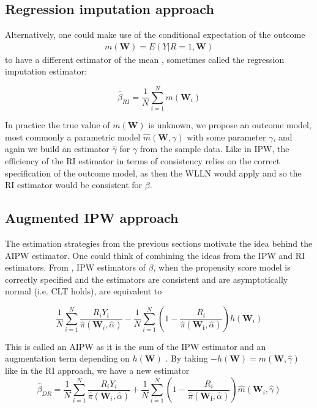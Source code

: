\documentclass[12pt,twoside]{article}
\begin{document}
\subsection{Regression imputation approach} 

Alternatively, one could make use of the conditional expectation of the outcome 
\begin{align*}
    m(\mathbf{W}) = E(Y|R= 1,\mathbf{W})
\end{align*}
to have a different estimator of the mean \citep{davidian,vansteelandt}, sometimes called the regression imputation estimator: 

\begin{equation}
    \hat{\beta}_ {RI} = \frac{1}{N}\sum_{i=1}^N m(\mathbf{W}_i)
\end{equation}

In practice the true value of $m(\mathbf{W})$ is unknown, we propose an outcome model, most commonly a parametric model $\hat m(\mathbf{W}, \gamma)$ with some parameter $\gamma$, and again we build an estimator $\hat{\gamma}$ for $\gamma$ from the sample data. Like in IPW, the efficiency of the RI estimator in terms of consistency relies on the correct specification of the outcome model, as then the WLLN would apply and so the RI estimator would be consistent for $\beta$. \\

\subsection{Augmented IPW approach} 

The estimation strategies from the previous sections motivate the idea behind the AIPW estimator. One could think of combining the ideas from the IPW and RI estimators. From \citet{davidian}, IPW estimators of $\beta$, when the propensity score model is correctly specified and the estimators are consistent and are asymptotically normal (i.e. CLT holds), are equivalent to 

\begin{equation}
    \frac{1}{N}\sum_{i=1}^{N}\frac{R_iY_i}{\hat\pi(\mathbf{W}_i, \hat{\alpha})} - \frac{1}{N}\sum_{i=1}^{N} \left(1 - \frac{R_i}{\hat\pi(\mathbf{W_i},\hat{\alpha})} \right) h(\mathbf{W}_i)
\end{equation}

This is called an AIPW as it is the sum of the IPW estimator and an augmentation term depending on $h(\mathbf{W})$ \citep{davidian}. By taking $-h(\mathbf{W}) = \hat m(\mathbf{W}, \hat{\gamma})$ like in the RI approach, we have a new estimator
\begin{equation}
    \hat\beta_{DR} = \frac{1}{N}\sum_{i=1}^{N}\frac{R_iY_i}{\hat \pi(\mathbf{W}_i, \hat{\alpha})} + \frac{1}{N}\sum_{i=1}^{N} \left(1 - \frac{R_i}{\hat\pi(\mathbf{W_i},\hat{\alpha})} \right) \hat m(\mathbf{W}_i, \hat\gamma)
\end{equation}
\end{document}
